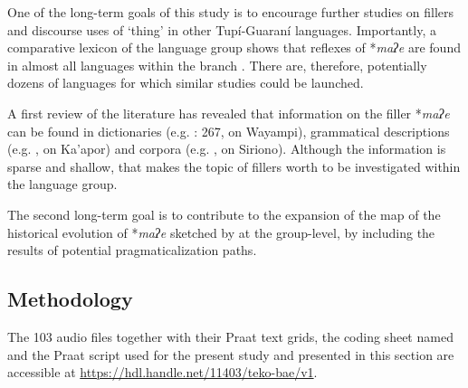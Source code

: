 \documentclass[output=paper]{langscibook}
\begin{document}
One of the long-term goals of this study is to encourage further studies on fillers and discourse uses of ‘thing’ in other Tupí-Guaraní languages. Importantly, a comparative lexicon of the language group shows that reflexes of *\textit{maʔe} are found in almost all languages within the branch \citep{chousouNodate}. There are, therefore, potentially dozens of languages for which similar studies could be launched.

A first review of the literature has revealed that information on the filler *\textit{maʔe} can be found in dictionaries (e.g. \citealt{Grenand1989}: 267, on Wayampi), grammatical descriptions (e.g. \citealt{Godoy2020}, on Ka’apor) and corpora (e.g. \citealt{Gasparini2015}, on Siriono). Although the information is sparse and shallow, that makes the topic of fillers worth to be investigated within the language group.

The second long-term goal is to contribute to the expansion of the map of the historical evolution of *\textit{maʔe} sketched by \citet[90]{AuweraAuwera2021} at the group-level, by including the results of potential pragmaticalization paths.  

\subsection{Methodology}
\label{sec:rose:1.4}
The 103 audio files together with their Praat text grids, the coding sheet named  and the Praat script used for the present study and presented in this section are accessible at \url{https://hdl.handle.net/11403/teko-bae/v1}.
\end{document}
